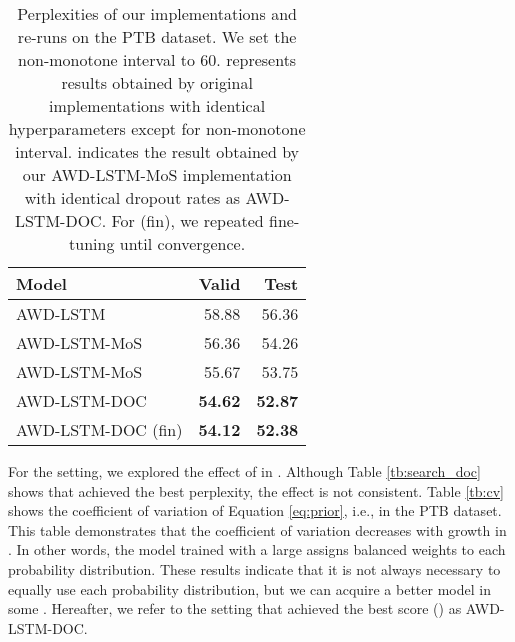 \documentclass[11pt,a4paper]{article}
\begin{document}
\begin{table}[!t]
  \centering
  \small
  \begin{tabular}{| l | r r |} \hline
  Model & Valid & Test \\ \hline
  AWD-LSTM & 58.88 & 56.36 \\
  AWD-LSTM-MoS & 56.36 & 54.26 \\
  AWD-LSTM-MoS & 55.67 & 53.75 \\
  AWD-LSTM-DOC & {\bf 54.62} & {\bf 52.87} \\
  AWD-LSTM-DOC (fin) & {\bf 54.12} & {\bf 52.38} \\ \hline
  \end{tabular}
  \caption{Perplexities of our implementations and re-runs on the PTB dataset. We set the non-monotone interval to 60.  represents results obtained by original implementations with identical hyperparameters except for non-monotone interval.  indicates the result obtained by our AWD-LSTM-MoS implementation with identical dropout rates as AWD-LSTM-DOC. For (fin), we repeated fine-tuning until convergence.\label{tb:compare_awdlstm}}
\end{table}


For the  setting, we explored the effect of  in .
Although Table \ref{tb:search_doc} shows that  achieved the best perplexity, the effect is not consistent.
Table \ref{tb:cv} shows the coefficient of variation of Equation \ref{eq:prior}, i.e.,  in the PTB dataset.
This table demonstrates that the coefficient of variation decreases with growth in .
In other words, the model trained with a large  assigns balanced weights to each probability distribution.
These results indicate that it is not always necessary to equally use each probability distribution, but we can acquire a better model in some .
Hereafter, we refer to the setting that achieved the best score () as AWD-LSTM-DOC.
\end{document}

